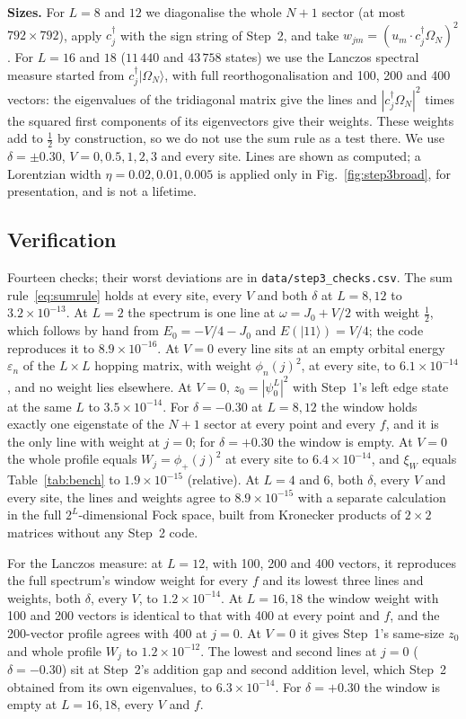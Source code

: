 \documentclass[11pt,a4paper]{article}
\newcommand{\dg}{^{\dagger}}
\begin{document}
\textbf{Sizes.}
For $L=8$ and $12$ we diagonalise the whole $N+1$ sector (at most $792\times792$), apply $c_j\dg$ with the sign string of Step~2, and take $w_{jm}=(u_m\cdot c_j\dg\Omega_N)^2$.
For $L=16$ and $18$ ($11\,440$ and $43\,758$ states) we use the Lanczos spectral measure started from $c_j\dg|\Omega_N\rangle$, with full reorthogonalisation and 100, 200 and 400 vectors: the eigenvalues of the tridiagonal matrix give the lines and $|c_j\dg\Omega_N|^2$ times the squared first components of its eigenvectors give their weights.
These weights add to $\frac12$ by construction, so we do not use the sum rule as a test there.
We use $\delta=\pm0.30$, $V=0,0.5,1,2,3$ and every site.
Lines are shown as computed; a Lorentzian width $\eta=0.02,0.01,0.005$ is applied only in Fig.~\ref{fig:step3broad}, for presentation, and is not a lifetime.

\subsection{Verification}

Fourteen checks; their worst deviations are in \texttt{data/step3\_checks.csv}.
The sum rule~\eqref{eq:sumrule} holds at every site, every $V$ and both $\delta$ at $L=8,12$ to $3.2\times10^{-13}$.
At $L=2$ the spectrum is one line at $\omega=J_0+V/2$ with weight $\tfrac12$, which follows by hand from $E_0=-V/4-J_0$ and $E(|11\rangle)=V/4$; the code reproduces it to $8.9\times10^{-16}$.
At $V=0$ every line sits at an empty orbital energy $\varepsilon_n$ of the $L\times L$ hopping matrix, with weight $\phi_n(j)^2$, at every site, to $6.1\times10^{-14}$, and no weight lies elsewhere.
At $V=0$, $z_0=|\psi^L_0|^2$ with Step~1's left edge state at the same $L$ to $3.5\times10^{-14}$.
For $\delta=-0.30$ at $L=8,12$ the window holds exactly one eigenstate of the $N+1$ sector at every point and every $f$, and it is the only line with weight at $j=0$; for $\delta=+0.30$ the window is empty.
At $V=0$ the whole profile equals $W_j=\phi_+(j)^2$ at every site to $6.4\times10^{-14}$, and $\xi_W$ equals Table~\ref{tab:bench} to $1.9\times10^{-15}$ (relative).
At $L=4$ and $6$, both $\delta$, every $V$ and every site, the lines and weights agree to $8.9\times10^{-15}$ with a separate calculation in the full $2^L$-dimensional Fock space, built from Kronecker products of $2\times2$ matrices without any Step~2 code.

For the Lanczos measure: at $L=12$, with 100, 200 and 400 vectors, it reproduces the full spectrum's window weight for every $f$ and its lowest three lines and weights, both $\delta$, every $V$, to $1.2\times10^{-14}$.
At $L=16,18$ the window weight with 100 and 200 vectors is identical to that with 400 at every point and $f$, and the 200-vector profile agrees with 400 at $j=0$.
At $V=0$ it gives Step~1's same-size $z_0$ and whole profile $W_j$ to $1.2\times10^{-12}$.
The lowest and second lines at $j=0$ ($\delta=-0.30$) sit at Step~2's addition gap and second addition level, which Step~2 obtained from its own eigenvalues, to $6.3\times10^{-14}$.
For $\delta=+0.30$ the window is empty at $L=16,18$, every $V$ and $f$.
\end{document}
